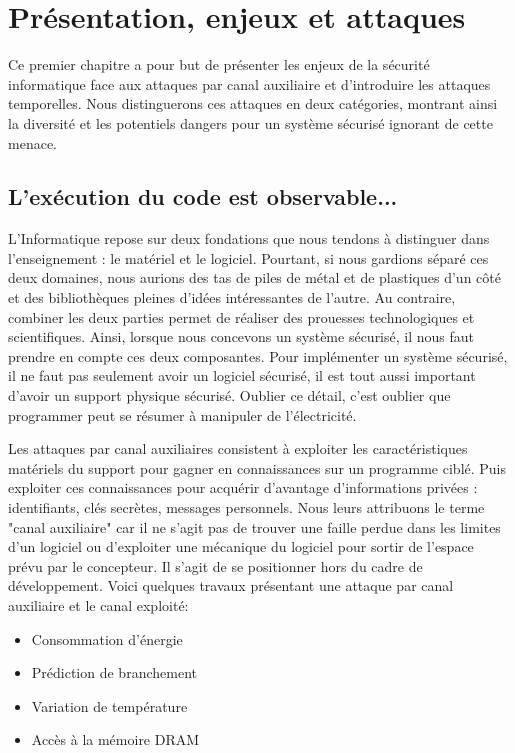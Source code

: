 \chapter{Présentation, enjeux et attaques}
\label{chap:constantTimePresentation}


Ce premier chapitre a pour but de présenter les enjeux de la sécurité informatique face aux attaques par canal auxiliaire et d'introduire les attaques temporelles. Nous distinguerons ces attaques en deux catégories, montrant ainsi la diversité et les potentiels dangers pour un système sécurisé ignorant de cette menace.



\section{L'exécution du code est observable...}

L'Informatique repose sur deux fondations que nous tendons à distinguer dans l'enseignement : le matériel et le logiciel. Pourtant, si nous gardions séparé ces deux domaines, nous aurions des tas de piles de métal et de plastiques d'un côté et des bibliothèques pleines d'idées intéressantes de l'autre. Au contraire, combiner les deux parties permet de réaliser des prouesses technologiques et scientifiques. Ainsi, lorsque nous concevons un système sécurisé, il nous faut prendre en compte ces deux composantes. Pour implémenter un système sécurisé, il ne faut pas seulement avoir un logiciel sécurisé, il est tout aussi important d'avoir un support physique sécurisé. Oublier ce détail, c'est oublier que programmer peut se résumer à manipuler de l'électricité.\medbreak

Les attaques par canal auxiliaires consistent à exploiter les caractéristiques matériels du support pour gagner en connaissances sur un programme ciblé. Puis exploiter ces connaissances pour acquérir d'avantage d'informations privées : identifiants, clés secrètes, messages personnels. Nous leurs attribuons le terme "canal auxiliaire" car il ne s'agit pas de trouver une faille perdue dans les limites d'un logiciel ou d'exploiter une mécanique du logiciel pour sortir de l'espace prévu par le concepteur. Il s'agit de se positionner hors du cadre de développement. Voici quelques travaux présentant une attaque par canal auxiliaire et le canal exploité:
\begin{itemize}
    \item[\cite{DPA_Attack}] Consommation d'énergie 
    \item[\cite{Branch_Attack}] Prédiction de branchement 
    \item[\cite{Thermal_Attack}] Variation de température
    \item[\cite{DRAM_Attack}] Accès à la mémoire DRAM
\end{itemize}\medbreak


